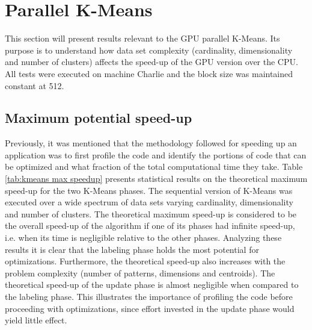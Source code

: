\section{Parallel K-Means}
\label{sec:parallel kmeans}

This section will present results relevant to the GPU parallel K-Means.
Its purpose is to understand how data set complexity (cardinality, dimensionality and number of clusters) affects the speed-up of the GPU version over the CPU.
All tests were executed on machine Charlie and the block size was maintained constant at 512.

\subsection{Maximum potential speed-up}

Previously, it was mentioned that the methodology followed for speeding up an application was to first profile the code and identify the portions of code that can be optimized and what fraction of the total computational time they take.
Table \ref{tab:kmeans max speedup} presents statistical results on the theoretical maximum speed-up for the two K-Means phases.
The sequential version of K-Means was executed over a wide spectrum of data sets varying cardinality, dimensionality and number of clusters.
The theoretical maximum speed-up is considered to be the overall speed-up of the algorithm if one of its phases had infinite speed-up, i.e. when its time is negligible relative to the other phases.
Analyzing these results it is clear that the labeling phase holds the most potential for optimizations.
Furthermore, the theoretical speed-up also increases with the problem complexity (number of patterns, dimensions and centroids).
The theoretical speed-up of the update phase is almost negligible when compared to the labeling phase.
This illustrates the importance of profiling the code before proceeding with optimizations, since effort invested in the update phase would yield little effect.

